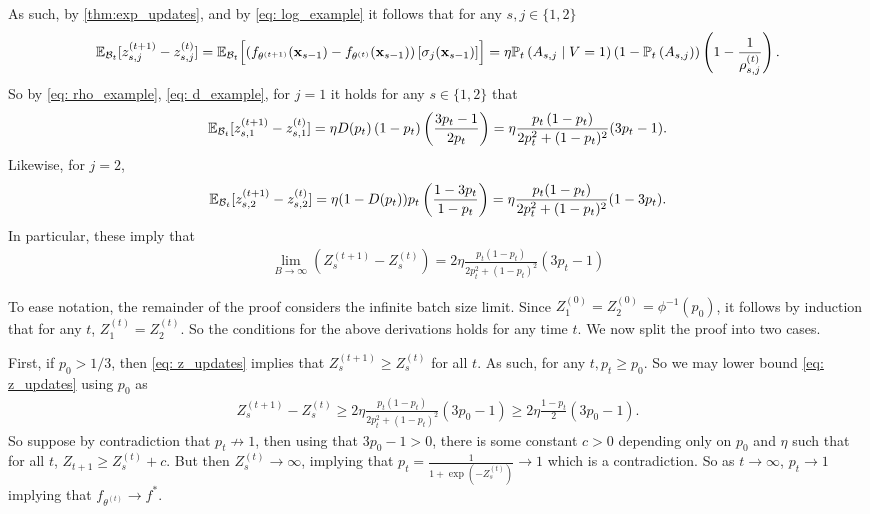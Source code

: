 \documentclass{article}
\theoremstyle{plain}
\theoremstyle{definition}
\theoremstyle{remark}
\begin{document}
As such, by \cref{thm:exp_updates}, and by \eqref{eq: log_example} it follows that for any $s,j\in\{1,2\}$
    \begin{align*}
        \mathbb{E}_{\mathcal{B}_t}[z_{s,j}^{(t+1)} - z_{s,j}^{(t)}]
        = \mathbb{E}_{\mathcal{B}_t}\Bigl[\left(f_{\theta^{(t+1)}}(\mathbf{x}_{s-1}) - f_{\theta^{(t)}}(\mathbf{x}_{s-1})\right)[\sigma_j(\mathbf{x}_{s-1})]\Bigr] = \eta \mathbb{P}_t\left(A_{s,j} \mid V=1\right)\left(1 - \mathbb{P}_t\left(A_{s,j}\right)\right)\left(1 - \frac{1}{\rho_{s, j}^{(t)}}\right).
    \end{align*}
So by \eqref{eq: rho_example}, \eqref{eq: d_example}, for $j=1$ it holds for any $s\in\{1,2\}$ that
\begin{align*}
    \mathbb{E}_{\mathcal{B}_t}[z_{s,1}^{(t+1)} - z_{s,1}^{(t)}] = \eta D(p_t)\left(1-p_t\right)\left(\frac{3p_t - 1}{2p_t}\right) = \eta \frac{p_t\left(1-p_t\right)}{2p_t^2 + (1-p_t)^2}(3p_t - 1).
\end{align*}
Likewise, for $j=2$,
\begin{align*}
    \mathbb{E}_{\mathcal{B}_t}[z_{s,2}^{(t+1)} - z_{s,2}^{(t)}] = \eta (1-D(p_t))p_t\left(\frac{1-3p_t}{1-p_t}\right) = \eta \frac{p_t(1-p_t)}{2p_t^2 + (1-p_t)^2} (1 - 3p_t).
\end{align*}
In particular, these imply that
\begin{align}\label{eq: z_updates}
    \lim_{B\to \infty}\left(Z_{s}^{(t+1)} - Z_{s}^{(t)}\right) = 2\eta \frac{p_t\left(1-p_t\right)}{2p_t^2 + (1-p_t)^2}(3p_t - 1)
\end{align}

To ease notation, the remainder of the proof considers the infinite batch size limit.
Since $Z_1^{(0)} = Z_2^{(0)} = \phi^{-1}(p_0)$, it follows by induction that for any $t$, $Z_1^{(t)} = Z_2^{(t)}$. So the conditions for the above derivations holds for any time $t$. We now split the proof into two cases. 

First, if $p_0 > 1/3$, then \eqref{eq: z_updates} implies that $Z_{s}^{(t+1)} \geq Z_{s}^{(t)}$ for all $t$. As such, for any $t, p_t \geq p_0$. So we may lower bound \eqref{eq: z_updates} using $p_0$ as
\begin{align*}
    Z_{s}^{(t+1)} - Z_{s}^{(t)} \geq 2\eta \frac{p_t\left(1-p_t\right)}{2p_t^2 + (1-p_t)^2}(3p_0 - 1) \geq 2 \eta \frac{1-p_t}{2} (3p_0 - 1).
\end{align*}
So suppose by contradiction that $p_t \not \to 1$, then using that $3p_0 - 1>0$, there is some constant $c>0$ depending only on $p_0$ and $\eta$ such that for all $t$, $Z_{t+1} \geq Z_{s}^{(t)} + c$. But then $Z_{s}^{(t)} \to \infty$, implying that $p_t = \frac{1}{1+\exp(-Z_{s}^{(t)})} \to 1$ which is a contradiction. So as $t\to\infty$, $p_t\to 1$ implying that $f_{\theta^{(t)}} \to f^*$.
\end{document}
